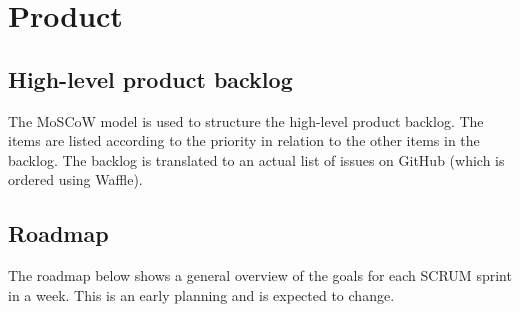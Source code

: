 \chapter{Product}

\section{High-level product backlog}
The MoSCoW model is used to structure the high-level product backlog.
The items are listed according to the priority in relation to the other items in the backlog.
The backlog is translated to an actual list of issues on \gls{GitHub} (which is ordered using Waffle\cite{waffle}).


\section{Roadmap}
The roadmap below shows a general overview of the goals for each \gls{SCRUM} sprint in a week.
This is an early planning and is expected to change.

